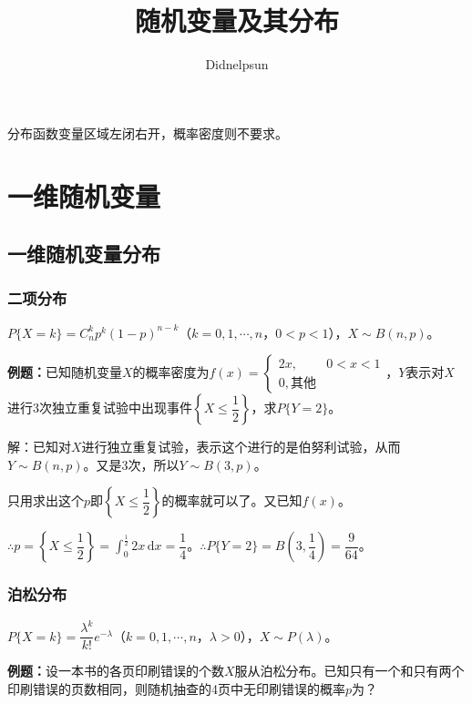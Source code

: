 \documentclass[UTF8, 12pt]{ctexart}
\author{Didnelpsun}
\title{随机变量及其分布}
\date{}
\begin{document}
\maketitle
\pagestyle{empty}
\thispagestyle{empty}
\tableofcontents
\thispagestyle{empty}
\newpage
\pagestyle{plain}
\setcounter{page}{1}

分布函数变量区域左闭右开，概率密度则不要求。

\section{一维随机变量}

\subsection{一维随机变量分布}

\subsubsection{二项分布}

$P\{X=k\}=C_n^kp^k(1-p)^{n-k}$（$k=0,1,\cdots,n$，$0<p<1$），$X\sim B(n,p)$。

\textbf{例题：}已知随机变量$X$的概率密度为$f(x)=\left\{\begin{array}{ll}
    2x, & 0<x<1 \\
    0, \text{其他}
\end{array}\right.$，$Y$表示对$X$进行3次独立重复试验中出现事件$\left\{X\leqslant\dfrac{1}{2}\right\}$，求$P\{Y=2\}$。\medskip

解：已知对$X$进行独立重复试验，表示这个进行的是伯努利试验，从而$Y\sim B(n,p)$。又是3次，所以$Y\sim B(3,p)$。

只用求出这个$p$即$\left\{X\leqslant\dfrac{1}{2}\right\}$的概率就可以了。又已知$f(x)$。

$\therefore p=\left\{X\leqslant\dfrac{1}{2}\right\}=\int_0^\frac{1}{2}2x\,\textrm{d}x=\dfrac{1}{4}$。$\therefore P\{Y=2\}=B\left(3,\dfrac{1}{4}\right)=\dfrac{9}{64}$。

\subsubsection{泊松分布}

$P\{X=k\}=\dfrac{\lambda^k}{k!}e^{-\lambda}$（$k=0,1,\cdots,n$，$\lambda>0$），$X\sim P(\lambda)$。

\textbf{例题：}设一本书的各页印刷错误的个数$X$服从泊松分布。已知只有一个和只有两个印刷错误的页数相同，则随机抽查的4页中无印刷错误的概率$p$为？
\end{document}
